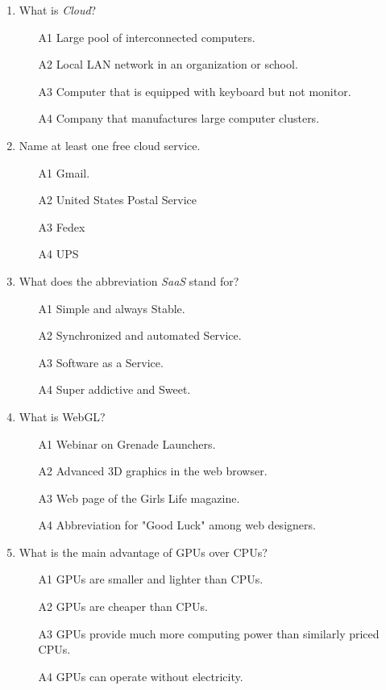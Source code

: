 \documentclass[article,A4,12pt]{llncs}
\begin{document}
\begin{enumerate}
\item What is {\em Cloud}?
\begin{enumerate}
\item[A1] Large pool of interconnected computers.
\item[A2] Local LAN network in an organization or school.
\item[A3] Computer that is equipped with keyboard but not monitor.
\item[A4] Company that manufactures large computer clusters.
\end{enumerate}
\item Name at least one free cloud service.
\begin{enumerate}
\item[A1] Gmail.
\item[A2] United States Postal Service
\item[A3] Fedex
\item[A4] UPS
\end{enumerate}
\item What does the abbreviation {\em SaaS} stand for?
\begin{enumerate}
\item[A1] Simple and always Stable.
\item[A2] Synchronized and automated Service.
\item[A3] Software as a Service.
\item[A4] Super addictive and Sweet.
\end{enumerate}
\item What is WebGL?
\begin{enumerate}
\item[A1] Webinar on Grenade Launchers.
\item[A2] Advanced 3D graphics in the web browser.
\item[A3] Web page of the Girls Life magazine.
\item[A4] Abbreviation for "Good Luck" among web designers.
\end{enumerate}
\item What is the main advantage of GPUs over CPUs?
\begin{enumerate}
\item[A1] GPUs are smaller and lighter than CPUs.
\item[A2] GPUs are cheaper than CPUs.
\item[A3] GPUs provide much more computing power than similarly priced CPUs.
\item[A4] GPUs can operate without electricity.

\end{enumerate}
\end{enumerate}
\end{document}
